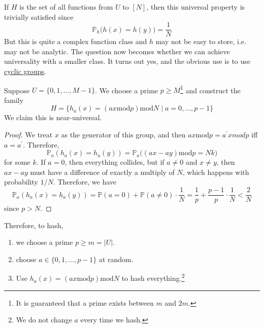   If $H$ is the set of all functions from $U$ to $[N]$, then this universal property is trivially satisfied since 
  \begin{equation}
      \mathbb{P}_{h} \big( h(x) = h(y) \big) = \frac{1}{N}
  \end{equation}
  But this is quite a complex function class and $h$ may not be easy to store, i.e. may not be analytic. The question now becomes whether we can achieve universality with a smaller class. It turns out yes, and the obvious use is to use \hyperref[alg-def:cyclic-group]{cyclic groups}. 

  \begin{lemma}
    \label{thm:carter-wegman-71}
    Suppose $U = \{0, 1, \ldots, M-1\}$. We choose a prime $p \geq M$\footnote{It is guaranteed that a prime exists between $m$ and $2m$.} and construct the family 
    \begin{equation}
      H = \{h_a (x) = (ax \mathrm{ mod } p ) \mathrm{ mod } N \mid a = 0, \ldots, p-1 \}
    \end{equation}
    We claim this is near-universal. 
  \end{lemma}
  \begin{proof}
    We treat $x$ as the generator of this group, and then $ax \mathrm{ mod } p = a^\prime x { mod } p$ iff $a = a^\prime$. Therefore, 
    \begin{equation}
      \mathbb{P}_a (h_a (x) = h_a (y)) = \mathbb{P}_a \big( (ax - ay) \mathrm{ mod } p = N k \big)
    \end{equation}
    for some $k$. If $a = 0$, then everything collides, but if $a \neq 0$ and $x \neq y$, then $ax - ay$ must have a difference of exactly a multiply of $N$, which happens with probability $1/N$. Therefore, we have 
    \begin{equation}
      \mathbb{P}_a (h_a (x) = h_a (y)) = \mathbb{P}(a = 0) + \mathbb{P}(a \neq 0) \cdot \frac{1}{N} = \frac{1}{p} + \frac{p-1}{p} \cdot \frac{1}{N} < \frac{2}{N} 
    \end{equation}
    since $p > N$. 
  \end{proof}

  Therefore, to hash, 
  \begin{enumerate}
    \item we choose a prime $p \geq m = |U|$. 
    \item choose $a \in \{0, 1, \ldots, p-1\}$ at random. 
    \item Use $h_a(x) = (ax \mathrm{ mod } p ) \mathrm{ mod } N$ to hash everything.\footnote{We do not change $a$ every time we hash. }
  \end{enumerate}

